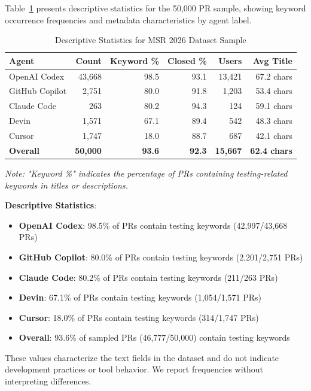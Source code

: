 \documentclass[conference]{IEEEtran}
\begin{document}
Table~\ref{tab:main_results} presents descriptive statistics for the 50,000 PR sample, showing keyword occurrence frequencies and metadata characteristics by agent label.

\begin{table}[H]
\centering
\caption{Descriptive Statistics for MSR 2026 Dataset Sample}
\label{tab:main_results}
\begin{tabular}{@{}lrrrrr@{}}
\toprule
\textbf{Agent} & \textbf{Count} & \textbf{Keyword \%} & \textbf{Closed \%} & \textbf{Users} & \textbf{Avg Title} \\
\midrule
OpenAI Codex & 43,668 & 98.5 & 93.1 & 13,421 & 67.2 chars \\
GitHub Copilot & 2,751 & 80.0 & 91.8 & 1,203 & 53.4 chars \\
Claude Code & 263 & 80.2 & 94.3 & 124 & 59.1 chars \\
Devin & 1,571 & 67.1 & 89.4 & 542 & 48.3 chars \\
Cursor & 1,747 & 18.0 & 88.7 & 687 & 42.1 chars \\
\midrule
\textbf{Overall} & \textbf{50,000} & \textbf{93.6} & \textbf{92.3} & \textbf{15,667} & \textbf{62.4 chars} \\
\bottomrule
\end{tabular}
\end{table}

\noindent \textit{Note: "Keyword \%" indicates the percentage of PRs containing testing-related keywords in titles or descriptions.}

\textbf{Descriptive Statistics}:
\begin{itemize}
    \item \textbf{OpenAI Codex}: 98.5\% of PRs contain testing keywords (42,997/43,668 PRs)
    \item \textbf{GitHub Copilot}: 80.0\% of PRs contain testing keywords (2,201/2,751 PRs)
    \item \textbf{Claude Code}: 80.2\% of PRs contain testing keywords (211/263 PRs)
    \item \textbf{Devin}: 67.1\% of PRs contain testing keywords (1,054/1,571 PRs)
    \item \textbf{Cursor}: 18.0\% of PRs contain testing keywords (314/1,747 PRs)
    \item \textbf{Overall}: 93.6\% of sampled PRs (46,777/50,000) contain testing keywords
\end{itemize}

These values characterize the text fields in the dataset and do not indicate development practices or tool behavior. We report frequencies without interpreting differences.
\end{document}
